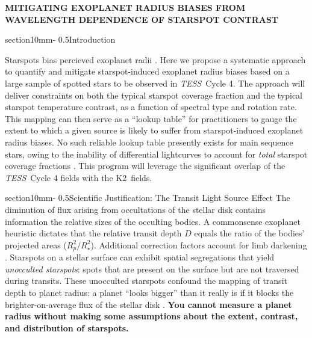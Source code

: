 \documentclass[letterpaper,12pt]{article}
\makeatletter
\renewcommand{\section}{\@startsection%
{section}{1}{0mm}{-\baselineskip}%
{0.5\baselineskip}{\normalfont\Large\bfseries}}%
\newcommand{\tess}{{\it TESS}}
\newcommand{\ktwo}{{K2}}
\makeatother
\begin{document}
\pagestyle{plain}



\begin{center}
\bfseries\uppercase{%
Mitigating exoplanet radius biases from wavelength dependence of starspot contrast
}
\end{center}



\section{Introduction}

Starspots bias percieved exoplanet radii \cite{2018ApJ...853..122R}.  Here we propose a systematic approach to quantify and mitigate starspot-induced exoplanet radius biases based on a large sample of spotted stars to be observed in \tess\ Cycle 4.  The approach will deliver constraints on both the typical starspot coverage fraction and the typical starspot temperature contrast, as a function of spectral type and rotation rate.  This mapping can then serve as a ``lookup table'' for practitioners to gauge the extent to which a given source is likely to suffer from starspot-induced exoplanet radius biases.  No such reliable lookup table presently exists for main sequence stars, owing to the inability of differential lightcurves to account for \emph{total} starspot coverage fractions \cite{2018ApJ...865..142B}.  This program will leverage the significant overlap of the \tess\ Cycle 4 fields with the \ktwo\ fields.

\section{Scientific Justification: The Transit Light Source Effect}
The diminution of flux arising from occultations of the stellar disk contains information the relative sizes of the occulting bodies.  A commonsense exoplanet heuristic dictates that the relative transit depth $D$ equals the ratio of the bodies' projected areas ($R_p^2/R_\star^2$).  Additional correction factors account for limb darkening \cite{2002ApJ...580L.171M}.  Starspots on a stellar surface can exhibit spatial segregations
that yield \emph{unocculted starspots}: spots that are present on the surface but are not traversed during transits.  These unocculted starspots confound the mapping of transit depth to planet radius: a planet ``looks bigger'' than it really is if it blocks the brighter-on-average flux of the stellar disk \cite{2018AJ....156...91M}.  \textbf{You cannot measure a planet radius without making some assumptions about the extent, contrast, and distribution of starspots.}
\end{document}
